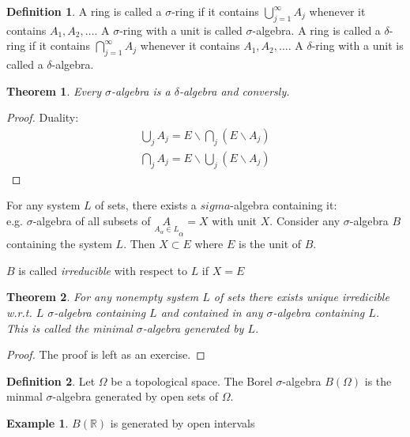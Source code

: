 \documentclass[11pt,a4paper]{report}
\newtheorem{theorem}{Theorem}[section]
\theoremstyle{plain}
\theoremstyle{definition}
\newtheorem*{defn}{Definition}
\newtheorem*{eg}{Example}
\theoremstyle{remark}
\newcommand{\R}{\mathbb{R}}
\begin{document}
\begin{defn}
  A ring is called a $\sigma$-ring if it contains $\bigcup_{j=1}^\infty A_j$ whenever it contains $A_1, A_2, \dots$.
  A $\sigma$-ring with a unit is called $\sigma$-algebra.
  A ring is called a $\delta$-ring if it contains $\bigcap_{j=1}^\infty A_j$ whenever it contains $A_1, A_2, \dots$.
  A $\delta$-ring with a unit is called a $\delta$-algebra.
\end{defn}

\begin{theorem}
  Every $\sigma$-algebra is a $\delta$-algebra and conversly.
\end{theorem}

\begin{proof}
  Duality:
  \begin{align}
    \bigcup_j A_j = E \backslash \bigcap_j(E\backslash A_j)\\
    \bigcap_j A_j = E \backslash \bigcup_j(E\backslash A_j)
  \end{align}
\end{proof}

For any system $L$ of sets, there exists a $sigma$-algebra containing it:\\
e.g. $\sigma$-algebra of all subsets of $\underset{A_\alpha \in L} A_\alpha = X$ with unit $X$.
Consider any $\sigma$-algebra $B$ containing the system $L$. Then $X \subset E$ where $E$ is the unit of $B$.

$B$ is called \textit{irreducible} with respect to $L$ if $X = E$

\begin{theorem}
    For any nonempty system $L$ of sets there exists unique irredicible w.r.t. $L$ $\sigma$-algebra containing $L$ and contained in any $\sigma$-algebra containing $L$.
    This is called the minimal $\sigma$-algebra generated by $L$.
\end{theorem}

\begin{proof}
    The proof is left as an exercise. %
\end{proof}

\begin{defn}
  Let $\Omega$ be a topological space. The Borel $\sigma$-algebra $B(\Omega)$ is the minmal $\sigma$-algebra generated by open sets of $\Omega$.
\end{defn}

\begin{eg}
  $B(\R)$ is generated by open intervals
\end{eg}
\end{document}

